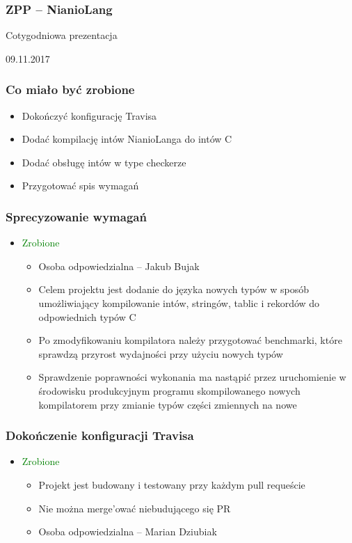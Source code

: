 \documentclass{beamer}
\begin{document}
	\begin{frame}
		\frametitle{ZPP -- NianioLang}
		Cotygodniowa prezentacja
		
		09.11.2017
	\end{frame}
	
	\begin{frame}
		\frametitle{Co miało być zrobione}
		\begin{itemize}
		 \item Dokończyć konfigurację Travisa
		 \item Dodać kompilację intów NianioLanga do intów C
		 \item Dodać obsługę intów w type checkerze
		 \item Przygotować spis wymagań
		\end{itemize}
	\end{frame}
	
	\begin{frame}
		\frametitle{Sprecyzowanie wymagań}
		\begin{itemize}
			\item\textcolor{green}{Zrobione}
			\begin{itemize}
				\item Osoba odpowiedzialna -- Jakub Bujak
				\item Celem projektu jest dodanie do języka nowych typów w sposób umożliwiający kompilowanie
				intów, stringów, tablic i rekordów do odpowiednich typów C
				\item Po zmodyfikowaniu kompilatora należy przygotować benchmarki, które sprawdzą przyrost wydajności
				przy użyciu nowych typów
				\item Sprawdzenie poprawności wykonania ma nastąpić przez uruchomienie w środowisku produkcyjnym
				programu skompilowanego nowych kompilatorem przy zmianie typów części zmiennych na nowe
			\end{itemize}
		\end{itemize}
	\end{frame}
	
	\begin{frame}
		\frametitle{Dokończenie konfiguracji Travisa}
		\begin{itemize}
			\item\textcolor{green}{Zrobione}
			\begin{itemize}
				\item Projekt jest budowany i testowany przy każdym pull requeście
				\item Nie można merge'ować niebudującego się PR
				\item Osoba odpowiedzialna -- Marian Dziubiak
			\end{itemize}
		\end{itemize}
	\end{frame}
	
\end{document}
